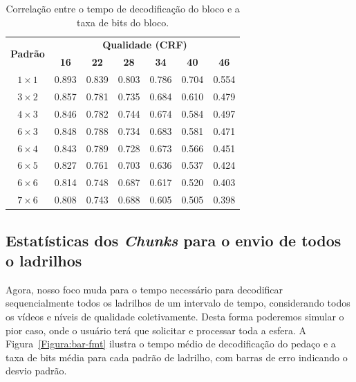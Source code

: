 \begin{table}[htb]
        \footnotesize
        \caption{Correlação entre o tempo de decodificação do bloco e a taxa de bits do bloco.}
        \label{tab:corr_list}
        \begin{center}
                \begin{tabular}{|c|c|c|c|c|c|c|}
                        \hline
                        \multirow{2}{*}{\textbf{Padrão}} & \multicolumn{6}{c|}{\bf Qualidade (CRF)} \\
                        \cline{2-7}
                        & \textbf{16} & \textbf{22} & \textbf{28} & \textbf{34} & \textbf{40} & \textbf{46} \\
                        \hline
                        $1\times 1$ & 0.893 & 0.839 & 0.803 & 0.786 & 0.704 & 0.554 \\
                        \hline
                        $3\times 2$ & 0.857 & 0.781 & 0.735 & 0.684 & 0.610 & 0.479 \\
                        \hline
                        $4\times 3$ & 0.846 & 0.782 & 0.744 & 0.674 & 0.584 & 0.497 \\
                        \hline
                        $6\times 3$ & 0.848 & 0.788 & 0.734 & 0.683 & 0.581 & 0.471 \\
                        \hline
                        $6\times 4$ & 0.843 & 0.789 & 0.728 & 0.673 & 0.566 & 0.451 \\
                        \hline
                        $6\times 5$ & 0.827 & 0.761 & 0.703 & 0.636 & 0.537 & 0.424 \\
                        \hline
                        $6\times 6$ & 0.814 & 0.748 & 0.687 & 0.617 & 0.520 & 0.403 \\
                        \hline
                        $7\times 6$ & 0.808 & 0.743 & 0.688 & 0.605 & 0.505 & 0.398 \\
                        \hline
                \end{tabular}
        \end{center}
\end{table}

\subsection{Estatísticas dos \textit{Chunks} para o envio de todos o ladrilhos}

Agora, nosso foco muda para o tempo necessário para decodificar sequencialmente todos os ladrilhos de um intervalo de tempo, considerando todos os vídeos e níveis de qualidade coletivamente. Desta forma poderemos simular o pior caso, onde o usuário terá que solicitar e processar toda a esfera. A Figura~\ref{Figura:bar-fmt} ilustra o tempo médio de decodificação do pedaço e a taxa de bits média para cada padrão de ladrilho, com barras de erro indicando o desvio padrão.

